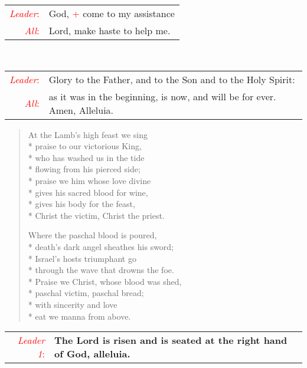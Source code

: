 \documentclass[letterpaper,14pt]{extarticle}
\newcommand{\sidestar}[1]{\textcolor{red}{\textit{#1}:}}
\newcommand{\rednote}[1]{\textcolor{red}{#1}}
\newcommand{\antiphon}[2]{
	\begin{tabular}[h]{r p{4.25in}}
		\sidestar{#1} & \textbf{#2}
	\end{tabular}}
\newcommand{\intercession}[2]{
	\begin{tabular}[h]{r p{4.25in}}
		\sidestar{Leader} & #1 \\
		\sidestar{All} & #2
	\end{tabular}}
\begin{document}
\intercession{God, \rednote{+} come to my assistance}
{Lord, make haste to help me.}\\
\intercession{Glory to the Father, and to the Son and to the Holy Spirit:}
{as it was in the beginning, is now, and will be for ever. Amen, Alleluia.}

\begin{verse}
At the Lamb's high feast we sing \\*
praise to our victorious King, \\*
who has washed us in the tide \\*
flowing from his pierced side; \\*
praise we him whose love divine \\*
gives his sacred blood for wine, \\*
gives his body for the feast, \\*
Christ the victim, Christ the priest.

Where the paschal blood is poured, \\*
death's dark angel sheathes his sword; \\*
Israel's hosts triumphant go \\*
through the wave that drowns the foe. \\*
Praise we Christ, whose blood was shed, \\*
paschal victim, paschal bread; \\*
with sincerity and love \\*
eat we manna from above.
\end{verse}
{}
\antiphon{Leader 1}{The Lord is risen and is seated at the right hand of God,
alleluia.}  
\end{document}
